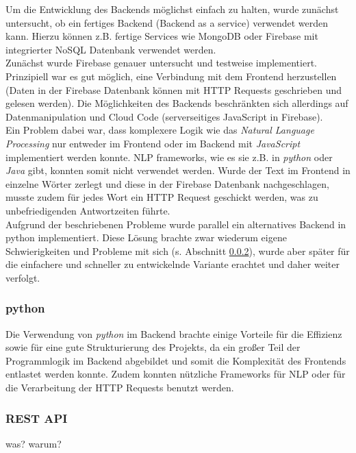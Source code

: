 Um die Entwicklung des Backends möglichst einfach zu halten, wurde zunächst untersucht, ob ein fertiges Backend (Backend as a service) verwendet werden kann. Hierzu können z.B. fertige Services wie MongoDB oder Firebase mit integrierter NoSQL Datenbank verwendet werden\cite{almootassem2017}.\\
Zunächst wurde Firebase genauer untersucht und testweise implementiert. Prinzipiell war es gut möglich, eine Verbindung mit dem Frontend herzustellen (Daten in der Firebase Datenbank können mit HTTP Requests geschrieben und gelesen werden). Die Möglichkeiten des Backends beschränkten sich allerdings auf Datenmanipulation und Cloud Code (serverseitiges JavaScript in Firebase).\\
Ein Problem dabei war, dass komplexere Logik wie das \textit{Natural Language Processing} nur entweder im Frontend oder im Backend mit \textit{JavaScript} implementiert werden konnte. NLP frameworks, wie es sie z.B. in \textit{python} oder \textit{Java} gibt, konnten somit nicht verwendet werden. Wurde der Text im Frontend in einzelne Wörter zerlegt und diese in der Firebase Datenbank nachgeschlagen, musste zudem für jedes Wort ein HTTP Request geschickt werden, was zu unbefriedigenden Antwortzeiten führte.\\

Aufgrund der beschriebenen Probleme wurde parallel ein alternatives Backend in python implementiert. Diese Lösung brachte zwar wiederum eigene Schwierigkeiten und Probleme mit sich (s. Abschnitt \ref{sec:REST}), wurde aber später für die einfachere und schneller zu entwickelnde Variante erachtet und daher weiter verfolgt.


\subsubsection{python}
\label{sec:python}

Die Verwendung von \textit{python}\cite{vanRossum2011} im Backend brachte einige Vorteile für die Effizienz sowie für eine gute Strukturierung des Projekts, da ein großer Teil der Programmlogik im Backend abgebildet und somit die Komplexität des Frontends entlastet werden konnte. Zudem konnten nützliche Frameworks für NLP oder für die Verarbeitung der HTTP Requests benutzt werden.

\subsubsection{REST API}
\label{sec:REST}
was? warum?

